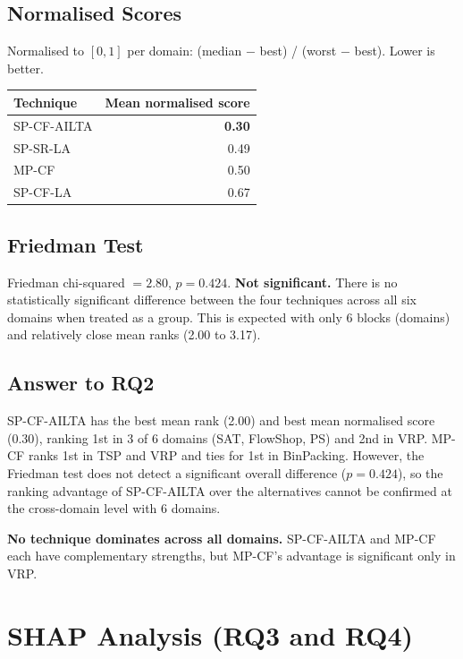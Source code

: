 \documentclass[11pt,a4paper]{article}
\begin{document}
\subsection{Normalised Scores}

Normalised to $[0, 1]$ per domain: (median $-$ best) / (worst $-$ best). Lower is better.

\begin{table}[H]
\centering
\begin{tabular}{lr}
\toprule
Technique & Mean normalised score \\
\midrule
SP-CF-AILTA & \textbf{0.30} \\
SP-SR-LA & 0.49 \\
MP-CF & 0.50 \\
SP-CF-LA & 0.67 \\
\bottomrule
\end{tabular}
\end{table}

\subsection{Friedman Test}

Friedman chi-squared $= 2.80$, $p = 0.424$. \textbf{Not significant.} There is no
statistically significant difference between the four techniques across all six
domains when treated as a group. This is expected with only 6 blocks (domains) and
relatively close mean ranks (2.00 to 3.17).

\subsection{Answer to RQ2}

SP-CF-AILTA has the best mean rank (2.00) and best mean normalised score (0.30),
ranking 1st in 3 of 6 domains (SAT, FlowShop, PS) and 2nd in VRP. MP-CF ranks
1st in TSP and VRP and ties for 1st in BinPacking. However, the Friedman test
does not detect a significant overall difference ($p = 0.424$), so the ranking
advantage of SP-CF-AILTA over the alternatives cannot be confirmed at the
cross-domain level with 6 domains.

\textbf{No technique dominates across all domains.} SP-CF-AILTA and MP-CF each have
complementary strengths, but MP-CF's advantage is significant only in VRP.

\section{SHAP Analysis (RQ3 and RQ4)}
\end{document}
